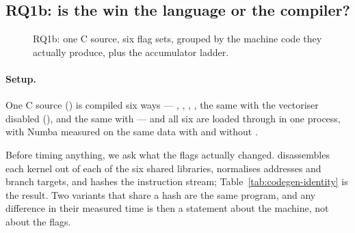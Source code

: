 \subsection{RQ1b: is the win the language or the compiler?}
\label{sec:rq1b}


\begin{figure}[t]
  \centering
  \caption{RQ1b: one C source, six flag sets, grouped by the machine code they actually
    produce, plus the accumulator ladder.}
  \label{fig:archflags}
\end{figure}

\paragraph{Setup.} One C source () is compiled six ways --- ,
, , , the same with the vectoriser disabled
(), and the same with  --- and all six
are loaded through  in one process, with Numba measured on the same data with and
without .

Before timing anything, we ask what the flags actually changed. 
disassembles each kernel out of each of the six shared libraries, normalises addresses and
branch targets, and hashes the instruction stream; Table~\ref{tab:codegen-identity} is the
result. Two variants that share a hash are the same program, and any difference in their
measured time is then a statement about the machine, not about the flags.

